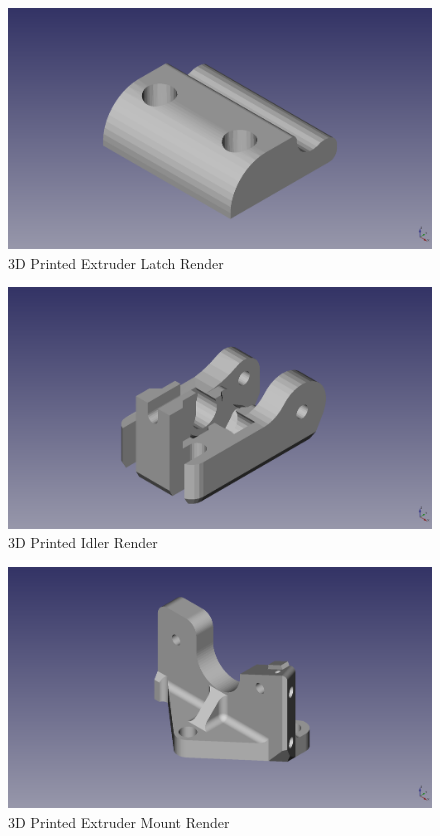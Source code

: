 \begin{figure}[H]
\centering
\includegraphics[keepaspectratio=true,angle=0,height=1.0\textheight,width=1.0\textwidth]{STL/extruderlatch.stl.png}
\caption{3D Printed Extruder Latch Render}
\label{fig:extruderlatchrender}
\end{figure}

\begin{figure}[H]
\centering
\includegraphics[keepaspectratio=true,angle=0,height=1.0\textheight,width=1.0\textwidth]{STL/idler.stl.png}
\caption{3D Printed Idler Render}
\label{fig:idlerrender}
\end{figure}

\begin{figure}[H]
\centering
\includegraphics[keepaspectratio=true,angle=0,height=1.0\textheight,width=1.0\textwidth]{STL/extrudermount.stl.png}
\caption{3D Printed Extruder Mount Render}
\label{fig:extrudermountrender}
\end{figure}

